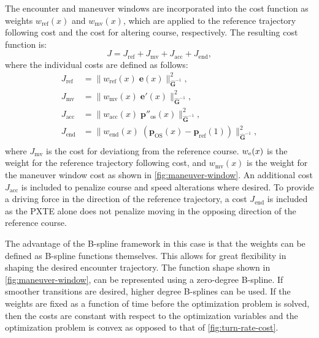 The encounter and maneuver windows are incorporated into the cost function as weights $w_\text{ref}(x)$ and $w_\text{mv}(x)$, which are applied to the reference trajectory following cost and the cost for altering course, respectively. The resulting cost function is:
\begin{equation}\label{eq:cost-maneuver-window-total}
    J = J_\text{ref} + J_\text{mv} + J_\mathrm{acc} + J_\mathrm{end},
\end{equation}
where the individual costs are defined as follows:
\begin{subequations}\label{eq:cost-maneuver-window}
    \begin{align}
        J_\text{ref} &= \|w_\text{ref}(x)\;\mathbf e(x)\|_{\mathbf{\hat G}^{-1}}^2 , 
        \label{eq:cost-maneuver-window-ref}\\
        J_\text{mv} &= \|w_\text{mv}(x)\;\mathbf e'(x)\|_{\mathbf{\hat G}^{-1}}^2 ,
        \label{eq:cost-maneuver-window-mv}\\
        J_\mathrm{acc} &= \|w_\text{acc}(x)\;\mathbf p''_\text{os}(x)\|_{\mathbf{\hat G}^{-1}}^2 , \label{eq:cost-maneuver-window-acc}\\
        J_\mathrm{end} &= \|w_\text{end}(x)\;(\mathbf p_\text{OS}(x)-\mathbf p_\text{ref}(1))\|_{\mathbf{\hat G}^{-1}}^2 , \label{eq:cost-maneuver-window-end}\\
    \end{align}
\end{subequations}
where $J_\text{mv}$ is the cost for deviationg from the reference course. $w_\text e(x)$ is the weight for the reference trajectory following cost, and $w_\text{mv}(x)$ is the weight for the maneuver window cost as shown in \cref{fig:maneuver-window}. An additional cost $J_\mathrm{acc}$ is included to penalize course and speed alterations where desired. To provide a driving force in the direction of the reference trajectory, a cost $J_\mathrm{end}$ is included as the PXTE alone does not penalize moving in the opposing direction of the reference course. 

The advantage of the B-spline framework in this case is that the weights can be defined as B-spline functions themselves. This allows for great flexibility in shaping the desired encounter trajectory. The function shape shown in \cref{fig:maneuver-window}, can be represented using a zero-degree B-spline. If smoother transitions are desired, higher degree B-splines can be used.
If the weights are fixed as a function of time before the optimization problem is solved, then the costs are constant with respect to the optimization variables and the optimization problem is convex as opposed to that of \cref{fig:turn-rate-cost}.

